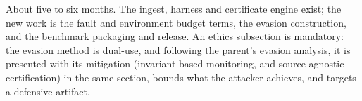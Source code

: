 \documentclass[11pt,a4paper]{article}
\begin{document}
\noindent
About five to six months. The ingest, harness and certificate engine exist; the
new work is the fault and environment budget terms, the evasion construction, and the
benchmark packaging and release. An ethics subsection is mandatory: the evasion
method is dual-use, and following the parent's evasion analysis, it is presented
with its mitigation (invariant-based monitoring, and source-agnostic
certification) in the same section, bounds what the attacker achieves, and
targets a defensive artifact.

\small


\end{document}
